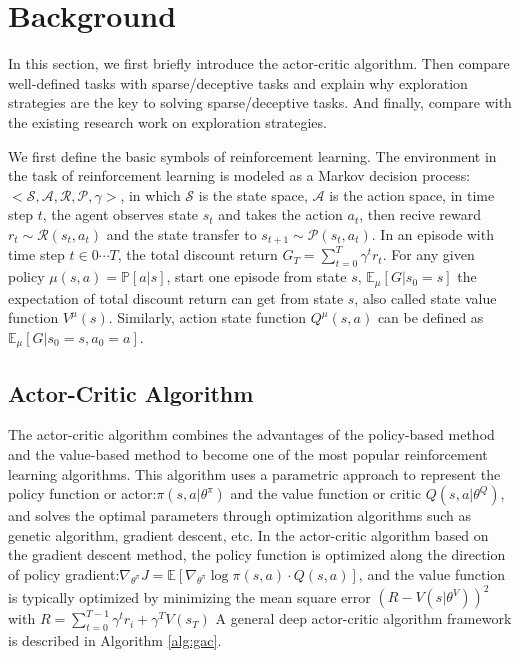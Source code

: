 \section{Background}
In this section, we first briefly introduce the actor-critic algorithm. Then compare well-defined tasks with sparse/deceptive tasks and explain why exploration strategies are the key to solving sparse/deceptive tasks. And finally, compare with the existing research work on exploration strategies.

We first define the basic symbols of reinforcement learning. The environment in the task of reinforcement learning is modeled as a Markov decision process: $<\mathcal{S},\mathcal{A},\mathcal{R},\mathcal{P},\gamma>$, in which $\mathcal{S}$ is the state space, $\mathcal{A}$ is the action space, in time step $t$, the agent observes state $s_t$ and takes the action $a_t$, then recive reward $r_t \sim \mathcal{R}(s_t,a_t)$ and the state transfer to $s_{t+1}\sim \mathcal{P}(s_t,a_t)$. In an episode with time step $t \in {0 \cdots T}$, the total discount return $G_T = \sum_{t=0}^{T}\gamma^t r_t$. For any given policy $\mu(s,a) = \mathbb{P}[a|s]$,  start one episode from state $s$, $\mathbb{E}_{\mu}[G|s_0=s]$ the expectation of total discount return can get from state $s$, also called state value function $V^{\mu}(s)$. Similarly, action state function $Q^{\mu}(s,a)$ can be defined as $\mathbb{E}_{\mu}[G|s_0=s,a_0=a]$.

\subsection{Actor-Critic Algorithm}
The actor-critic algorithm combines the advantages of the policy-based method and the value-based method to become one of the most popular reinforcement learning algorithms. This algorithm uses a parametric approach to represent the policy function or actor:$\pi(s,a|\theta^{\pi})$ and the value function or critic $Q(s, a|\theta^{Q})$, and solves the optimal parameters through optimization algorithms such as genetic algorithm, gradient descent, etc. In the actor-critic algorithm based on the gradient descent method, the policy function is optimized along the direction of policy gradient:$\nabla_{\theta^{\pi}} J = \mathbb{E}[\nabla_{\theta^{\pi}}\log \pi(s,a)\cdot Q(s,a)]$, and the value function is typically optimized by minimizing the mean square error $(R-V(s|\theta^V))^2$ with $R = \sum_{t=0}^{T-1}\gamma^t r_i +\gamma^TV(s_T)$  A general deep actor-critic algorithm framework is described in Algorithm \ref{alg:gac}.

